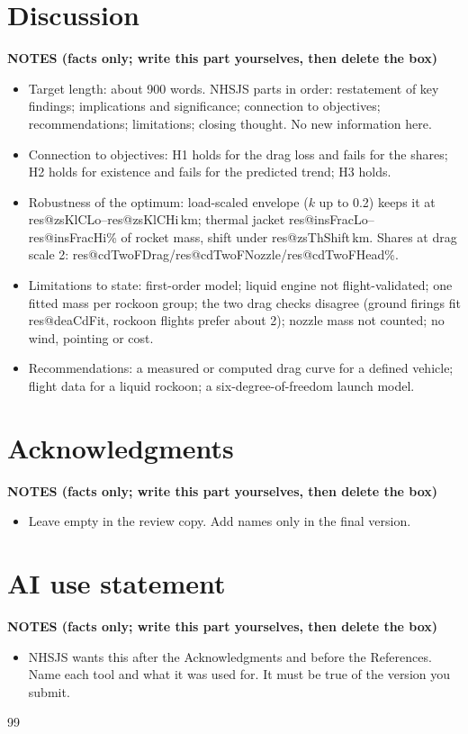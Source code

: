 \documentclass[12pt,a4paper]{article}
\makeatletter
\newcommand{\R}[1]{\csname res@#1\endcsname}
\newif\ifonline 
\newenvironment{notes}{\begin{shaded}\small\textbf{NOTES (facts only; write this part yourselves, then delete the box)}\begin{itemize}}{\end{itemize}\end{shaded}}
\makeatother
\begin{document}
\section*{Discussion}
\begin{notes}
\item Target length: about 900 words. NHSJS parts in order: restatement of key findings; implications and significance; connection to objectives; recommendations; limitations; closing thought. No new information here.
\item Connection to objectives: H1 holds for the drag loss and fails for the shares; H2 holds for existence and fails for the predicted trend; H3 holds.
\item Robustness of the optimum: load-scaled envelope ($k$ up to 0.2) keeps it at \R{zsKlCLo}--\R{zsKlCHi}\,km; thermal jacket \R{insFracLo}--\R{insFracHi}\% of rocket mass, shift under \R{zsThShift}\,km. Shares at drag scale 2: \R{cdTwoFDrag}/\R{cdTwoFNozzle}/\R{cdTwoFHead}\%.
\item Limitations to state: first-order model; liquid engine not flight-validated; one fitted mass per rockoon group; the two drag checks disagree (ground firings fit \R{deaCdFit}, rockoon flights prefer about 2); nozzle mass not counted; no wind, pointing or cost.
\item Recommendations: a measured or computed drag curve for a defined vehicle; flight data for a liquid rockoon; a six-degree-of-freedom launch model.
\end{notes}

\section*{Acknowledgments}
\begin{notes}
\item Leave empty in the review copy. Add names only in the final version.
\end{notes}

\section*{AI use statement}
\begin{notes}
\item NHSJS wants this after the Acknowledgments and before the References. Name each tool and what it was used for. It must be true of the version you submit.
\end{notes}

\ifonline\else
\begin{thebibliography}{99}

\end{thebibliography}
\fi
\end{document}
